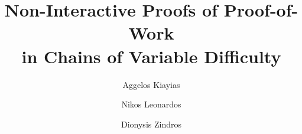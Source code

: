 \title{Non-Interactive Proofs of Proof-of-Work\\
       in Chains of Variable Difficulty}

\ifanonymous
  \author{}
  \institute{}
\else
  \author{
    Aggelos Kiayias \and
    Nikos Leonardos \and
    Dionysis Zindros
  }
\fi
\maketitle
